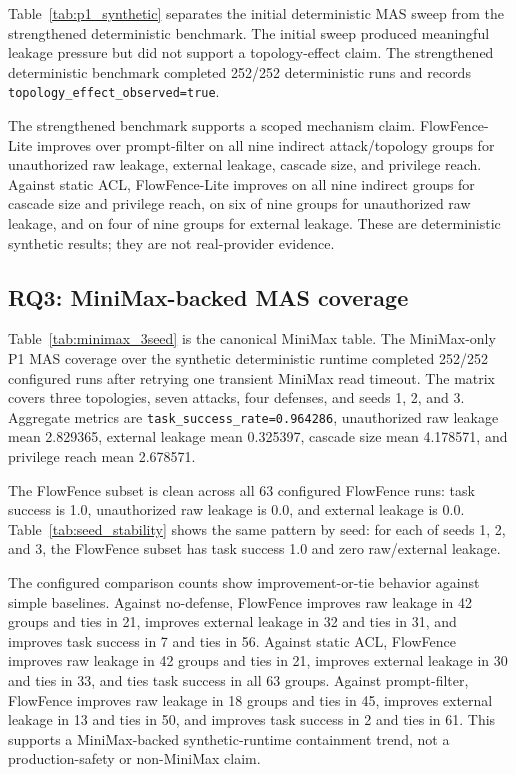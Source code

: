 Table~\ref{tab:p1_synthetic} separates the initial deterministic MAS sweep from the strengthened deterministic benchmark. The initial sweep produced meaningful leakage pressure but did not support a topology-effect claim. The strengthened deterministic benchmark completed 252/252 deterministic runs and records \texttt{topology\_effect\_observed=true}.

The strengthened benchmark supports a scoped mechanism claim. FlowFence-Lite improves over prompt-filter on all nine indirect attack/topology groups for unauthorized raw leakage, external leakage, cascade size, and privilege reach. Against static ACL, FlowFence-Lite improves on all nine indirect groups for cascade size and privilege reach, on six of nine groups for unauthorized raw leakage, and on four of nine groups for external leakage. These are deterministic synthetic results; they are not real-provider evidence.

\subsection{RQ3: MiniMax-backed MAS coverage}

Table~\ref{tab:minimax_3seed} is the canonical MiniMax table. The MiniMax-only P1 MAS coverage over the synthetic deterministic runtime completed 252/252 configured runs after retrying one transient MiniMax read timeout. The matrix covers three topologies, seven attacks, four defenses, and seeds 1, 2, and 3. Aggregate metrics are \texttt{task\_success\_rate=0.964286}, unauthorized raw leakage mean 2.829365, external leakage mean 0.325397, cascade size mean 4.178571, and privilege reach mean 2.678571.

The FlowFence subset is clean across all 63 configured FlowFence runs: task success is 1.0, unauthorized raw leakage is 0.0, and external leakage is 0.0. Table~\ref{tab:seed_stability} shows the same pattern by seed: for each of seeds 1, 2, and 3, the FlowFence subset has task success 1.0 and zero raw/external leakage.

The configured comparison counts show improvement-or-tie behavior against simple baselines. Against no-defense, FlowFence improves raw leakage in 42 groups and ties in 21, improves external leakage in 32 and ties in 31, and improves task success in 7 and ties in 56. Against static ACL, FlowFence improves raw leakage in 42 groups and ties in 21, improves external leakage in 30 and ties in 33, and ties task success in all 63 groups. Against prompt-filter, FlowFence improves raw leakage in 18 groups and ties in 45, improves external leakage in 13 and ties in 50, and improves task success in 2 and ties in 61. This supports a MiniMax-backed synthetic-runtime containment trend, not a production-safety or non-MiniMax claim.

